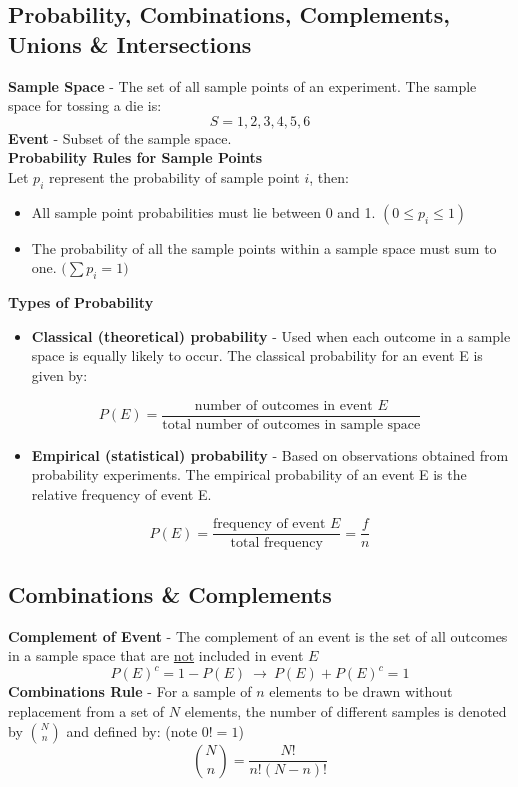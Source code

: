 \documentclass[a4paper]{article}
\let\bf\textbf
\begin{document}
\subsection{Probability, Combinations, Complements, Unions \& Intersections}
\bf{Sample Space} - The set of all sample points of an experiment. The sample space for tossing a die is:
\begin{equation}
    S = {1, 2, 3, 4, 5, 6}
\end{equation}
\bf{Event} - Subset of the sample space.
\vspace{5mm}\\
\bf{Probability Rules for Sample Points}\\
Let $p_i$ represent the probability of sample point $i$, then:
\begin{itemize}
    \item All sample point probabilities must lie between 0 and 1. $(0 \leq p_i \leq 1)$
    \item The probability of all the sample points within a sample space must sum to one. $\big(\sum p_i = 1\big)$
\end{itemize}
\vspace{5mm}
\bf{Types of Probability}
\begin{itemize}
    \item \bf{Classical (theoretical) probability} - Used when each outcome in a sample space is equally likely to occur. The classical probability for an event E is given by:
\end{itemize}
\begin{equation}
    P(E) = \frac{\text{number of outcomes in event $E$}}{\text{total number of outcomes in sample space}}
\end{equation}
\begin{itemize}
    \item \bf{Empirical (statistical) probability} - Based on observations obtained from probability experiments. The empirical probability of an event E is the relative frequency of event E.
\end{itemize}
\begin{equation}
    P(E) = \frac{\text{frequency of event $E$}}{\text{total frequency}} = \frac{f}{n}
\end{equation}
\newpage
\subsection{Combinations \& Complements}
\bf{Complement of Event} - The complement of an event is the set of all outcomes in a sample space that are \underline{not} included in event $E$
\begin{equation}
    P(E)^c = 1 - P(E) \ \to \ P(E) + P(E)^c = 1
\end{equation} 
\bf{Combinations Rule} - For a sample of $n$ elements to be drawn without replacement from a set of $N$ elements, the number of different samples is denoted by $\binom Nn$ and defined by: \hspace{15mm}(note $0! = 1$)
\begin{equation}
    \binom Nn = \frac{N!}{n!(N-n)!}
\end{equation}
\end{document}
